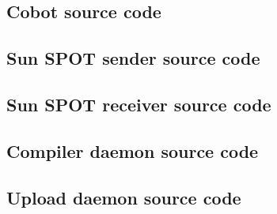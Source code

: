 \documentclass[a4paper,10pt]{article} %
\begin{document}
\subsection{Cobot source code} %
\label{sub:Cobot source code}




\subsection{Sun SPOT sender source code} %
\label{sub:Sun SPOT sender source code}




\subsection{Sun SPOT receiver source code} %
\label{sub:Sun SPOT receiver source code}




\subsection{Compiler daemon source code} %
\label{sub:Compiler daemon source code}




\subsection{Upload daemon source code} %
\label{sub:Upload daemon source code}







\end{document}
